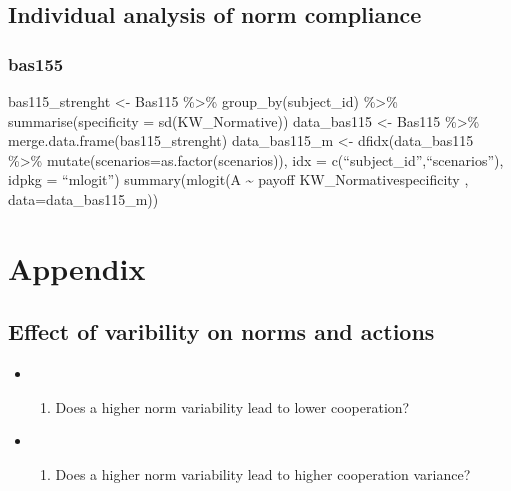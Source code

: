 \hypertarget{individual-analysis-of-norm-compliance}{%
\subsection{Individual analysis of norm
compliance}\label{individual-analysis-of-norm-compliance}}

\hypertarget{bas155}{%
\subsubsection{bas155}\label{bas155}}

bas115\_strenght \textless- Bas115 \%\textgreater\%
group\_by(subject\_id) \%\textgreater\% summarise(specificity =
sd(KW\_Normative)) data\_bas115 \textless- Bas115 \%\textgreater\%
merge.data.frame(bas115\_strenght) data\_bas115\_m \textless-
dfidx(data\_bas115 \%\textgreater\%
mutate(scenarios=as.factor(scenarios)), idx =
c(``subject\_id'',``scenarios''), idpkg = ``mlogit'') summary(mlogit(A
\textasciitilde{} payoff \textbar KW\_Normative\textbar specificity ,
data=data\_bas115\_m))

\hypertarget{appendix}{%
\section{Appendix}\label{appendix}}

\hypertarget{effect-of-varibility-on-norms-and-actions}{%
\subsection{Effect of varibility on norms and
actions}\label{effect-of-varibility-on-norms-and-actions}}

\begin{itemize}
\item
  \begin{enumerate}
  \def\labelenumi{\alph{enumi}.}
  \tightlist
  \item
    Does a higher norm variability lead to lower cooperation?
  \end{enumerate}
\item
  \begin{enumerate}
  \def\labelenumi{\alph{enumi}.}
  \setcounter{enumi}{1}
  \tightlist
  \item
    Does a higher norm variability lead to higher cooperation variance?
  \end{enumerate}
\end{itemize}

